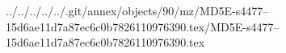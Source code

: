 ../../../../../.git/annex/objects/90/mz/MD5E-s4477--15d6ae11d7a87ec6c0b7826110976390.tex/MD5E-s4477--15d6ae11d7a87ec6c0b7826110976390.tex